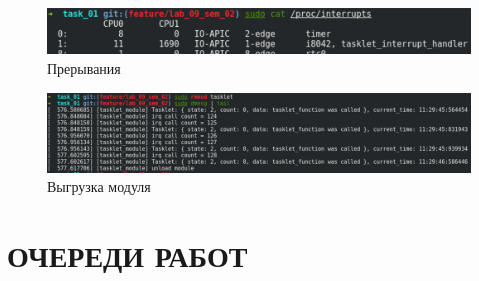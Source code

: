 \begin{figure}[H]
    \centering
    \includegraphics[scale=0.7]{img/part_01/interrupt.png}
    \caption{Прерывания}
\end{figure}

\begin{figure}[H]
    \centering
    \includegraphics[scale=0.45]{img/part_01/rmmod.png}
    \caption{Выгрузка модуля}
\end{figure}

\section{ОЧЕРЕДИ РАБОТ}

